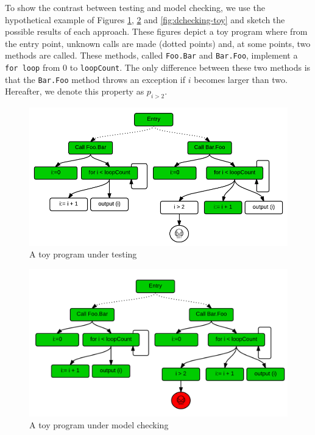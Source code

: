 \documentclass[12pt]{report}
\begin{document}
To show the contrast between testing and model checking, we use the
hypothetical example of Figures \ref{fig:testing-toy},
\ref{fig:checking-toy} and \ref{fig:dchecking-toy} and sketch the
possible results of each approach. These figures depict a toy program
where from the entry point, unknown calls are made (dotted points) and,
at some points, two methods are called. These methods, called
\texttt{Foo.Bar} and \texttt{Bar.Foo}, implement a \texttt{for loop}
from 0 to \texttt{loopCount}. The only difference between these two
methods is that the \texttt{Bar.Foo} method throws an exception if \(i\)
becomes larger than two. Hereafter, we denote this property as
\(p_{i > 2}\).

\begin{figure}
  \centering
    \includegraphics[scale=0.8]{media/chap8/test.png}
    \caption{A toy program under testing
    \label{fig:testing-toy}}
\end{figure}

\begin{figure}
  \centering
    \includegraphics[scale=0.8]{media/chap8/mc.png}
    \caption{A toy program under model checking
    \label{fig:checking-toy}}
\end{figure}
\end{document}
